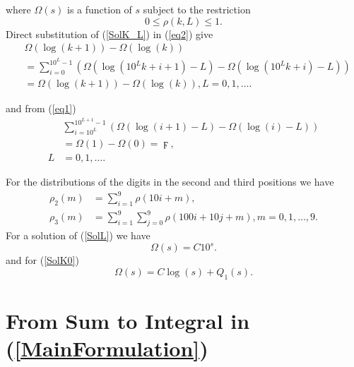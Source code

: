 \documentclass[titlepage,fleqn]{article}%
\begin{document}
\noindent where $\Omega(s)$ is a function of $s$ subject to the restriction%
\[
0\leq\rho(k,L)\leq1.
\]
Direct substitution of (\ref{SolK_L}) in (\ref{eq2}) give%
\begin{align}
&  \Omega(\log(k+1))-\Omega(\log(k))\label{identical2}\\
&  =%
{\displaystyle\sum\limits_{i=0}^{10^{L}-1}}
\left(  \Omega(\log(10^{L}k+i+1)-L)-\Omega(\log(10^{L}k+i)-L)\right)
\nonumber\\
&  =\Omega(\log(k+1))-\Omega(\log(k)),L=0,1,\ldots.\nonumber
\end{align}


\noindent and from (\ref{eq1})%
\begin{align}
&
{\displaystyle\sum\limits_{i=10^{L}}^{10^{L+1}-1}}
\left(  \Omega(\log(i+1)-L)-\Omega(\log(i)-L)\right) \label{identical1}\\
&  =\Omega(1)-\Omega(0)=\digamma,\nonumber\\
L  &  =0,1,\ldots.\nonumber
\end{align}


For the distributions of the digits in the second and third positions we have%
\begin{align*}
\rho_{2}(m)  &  =%
{\displaystyle\sum\limits_{i=1}^{9}}
\rho(10i+m),\\
\rho_{3}(m)  &  =%
{\displaystyle\sum\limits_{i=1}^{9}}
{\displaystyle\sum\limits_{j=0}^{9}}
\rho(100i+10j+m),m=0,1,\ldots,9.
\end{align*}
For a solution of (\ref{SolL}) we have%
\[
\Omega(s)=C10^{s}.
\]
and for (\ref{SolK0})%
\[
\Omega(s)=C\log(s)+Q_{1}(s).
\]


\section{From Sum to Integral in (\ref{MainFormulation})}%
\end{document}
